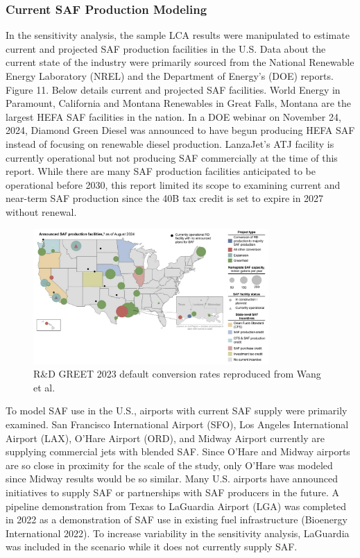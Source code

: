 \documentclass[12pt]{article}
\begin{document}
\subsubsection{ Current SAF Production Modeling}

In the sensitivity analysis, the sample LCA results were manipulated to estimate current and projected SAF production facilities in the U.S. Data about the current state of the industry were primarily sourced from the National Renewable Energy Laboratory (NREL)  and the Department of Energy’s (DOE) reports. Figure 11. Below details current and projected SAF facilities. World Energy in Paramount, California and Montana Renewables in Great Falls, Montana are the largest HEFA SAF facilities in the nation. In a DOE webinar on November 24, 2024, Diamond Green Diesel was announced to have begun producing HEFA SAF instead of focusing on renewable diesel production. LanzaJet’s ATJ facility is currently operational but not producing SAF commercially at the time of this report. While there are many SAF production facilities anticipated to be operational before 2030, this report limited its scope to examining current and near-term SAF production since the 40B tax credit is set to expire in 2027 without renewal. 

\begin{figure}[H]
\centering
\includegraphics[width=0.8\textwidth]{Fig 12.png} %
\caption{R\&D GREET 2023 default conversion rates  reproduced from Wang et al.}
\label{fig:fig12}
\end{figure}

To model SAF use in the U.S., airports with current SAF supply were primarily examined. San Francisco International Airport (SFO), Los Angeles International Airport (LAX), O’Hare Airport (ORD), and Midway Airport currently are supplying commercial jets with blended SAF. Since O’Hare  and Midway airports are so close in proximity for the scale of the study, only O’Hare was modeled since Midway results would be so similar. Many U.S. airports have announced initiatives to supply SAF or partnerships with SAF producers in the future. A pipeline demonstration from Texas to LaGuardia Airport (LGA) was completed in 2022 as a demonstration of SAF use in existing fuel infrastructure (Bioenergy International 2022). To increase variability in the sensitivity analysis, LaGuardia was included in the scenario while it does not currently supply SAF. 
\end{document}
